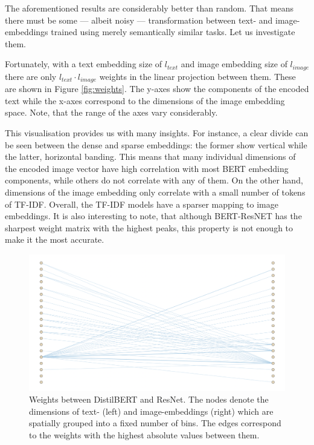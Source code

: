 The aforementioned results are considerably better than random. That means there must be some --- albeit noisy --- transformation between text- and image-embeddings trained using merely semantically similar tasks. Let us investigate them.

Fortunately, with a text embedding size of $l_{text}$ and image embedding size of $l_{image}$ there are only $l_{text} \cdot l_{image}$ weights in the linear projection between them. These are shown in Figure \ref{fig:weights}. The y-axes show the components of the encoded text while the x-axes correspond to the dimensions of the image embedding space. Note, that the range of the axes vary considerably.

This visualisation provides us with many insights. For instance, a clear divide can be seen between the dense and sparse embeddings: the former show vertical while the latter, horizontal banding. This means that many individual dimensions of the encoded image vector have high correlation with most BERT embedding components, while others do not correlate with any of them. On the other hand, dimensions of the image embedding only correlate with a small number of tokens of TF-IDF. Overall, the TF-IDF models have a sparser mapping to image embeddings. It is also interesting to note, that although BERT-ResNET has the sharpest weight matrix with the highest peaks, this property is not enough to make it the most accurate.

\begin{figure}
  \centering
  \includegraphics[width=1 \linewidth]{figures/bert-top.png}
  \caption{Weights between DistilBERT and ResNet. The nodes denote the dimensions of text- (left) and image-embeddings (right) which are spatially grouped into a fixed number of bins. The edges correspond to the weights with the highest absolute values between them.}
  \label{fig:bert-top}
\end{figure}

